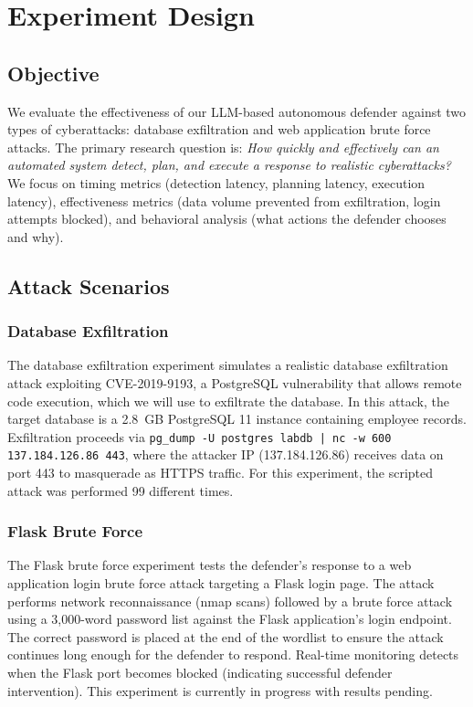 \section{Experiment Design}

\subsection{Objective}

We evaluate the effectiveness of our LLM-based autonomous defender against two types of cyberattacks: database exfiltration and web application brute force attacks. The primary research question is: \textit{How quickly and effectively can an automated system detect, plan, and execute a response to realistic cyberattacks?} We focus on timing metrics (detection latency, planning latency, execution latency), effectiveness metrics (data volume prevented from exfiltration, login attempts blocked), and behavioral analysis (what actions the defender chooses and why).

\subsection{Attack Scenarios}

\subsubsection{Database Exfiltration}

The database exfiltration experiment simulates a realistic database exfiltration attack exploiting CVE-2019-9193, a PostgreSQL vulnerability that allows remote code execution, which we will use to exfiltrate the database. In this attack, the target database is a 2.8~GB PostgreSQL 11 instance containing employee records. Exfiltration proceeds via \texttt{pg\_dump -U postgres labdb | nc -w 600 137.184.126.86 443}, where the attacker IP (137.184.126.86) receives data on port 443 to masquerade as HTTPS traffic. For this experiment, the scripted attack was performed 99 different times.

\subsubsection{Flask Brute Force}

The Flask brute force experiment tests the defender's response to a web application login brute force attack targeting a Flask login page. The attack performs network reconnaissance (nmap scans) followed by a brute force attack using a 3,000-word password list against the Flask application's login endpoint. The correct password is placed at the end of the wordlist to ensure the attack continues long enough for the defender to respond. Real-time monitoring detects when the Flask port becomes blocked (indicating successful defender intervention). This experiment is currently in progress with results pending.

